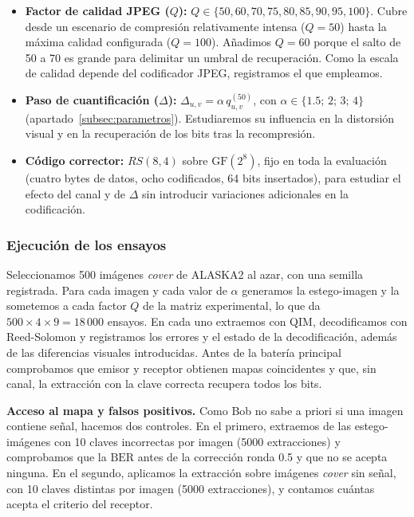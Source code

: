 \documentclass[IB]{TFUOC}%
\begin{document}
\begin{itemize}
    \item \textbf{Factor de calidad JPEG ($Q$):} $Q\in\{50, 60, 70, 75, 80, 85, 90, 95, 100\}$. Cubre desde un escenario de compresión relativamente intensa ($Q=50$) hasta la máxima calidad configurada ($Q=100$). Añadimos $Q=60$ porque el salto de 50 a 70 es grande para delimitar un umbral de recuperación. Como la escala de calidad depende del codificador JPEG, registramos el que empleamos.
    \item \textbf{Paso de cuantificación ($\Delta$):} $\Delta_{u,v}=\alpha\,q^{(50)}_{u,v}$, con $\alpha\in\{1{.}5;\,2;\,3;\,4\}$ (apartado~\ref{subsec:parametros}). Estudiaremos su influencia en la distorsión visual y en la recuperación de los bits tras la recompresión.
    \item \textbf{Código corrector:} $RS(8,4)$ sobre $\mathrm{GF}(2^8)$, fijo en toda la evaluación (cuatro bytes de datos, ocho codificados, 64 bits insertados), para estudiar el efecto del canal y de $\Delta$ sin introducir variaciones adicionales en la codificación.
\end{itemize}

\subsubsection{Ejecución de los ensayos}

Seleccionamos 500 imágenes \textit{cover} de ALASKA2 al azar, con una semilla registrada. Para cada imagen y cada valor de $\alpha$ generamos la estego-imagen y la sometemos a cada factor $Q$ de la matriz experimental, lo que da $500\times4\times9=18\,000$ ensayos. En cada uno extraemos con QIM, decodificamos con Reed-Solomon y registramos los errores y el estado de la decodificación, además de las diferencias visuales introducidas. Antes de la batería principal comprobamos que emisor y receptor obtienen mapas coincidentes y que, sin canal, la extracción con la clave correcta recupera todos los bits.

\textbf{Acceso al mapa y falsos positivos.} Como Bob no sabe a priori si una imagen contiene señal, hacemos dos controles. En el primero, extraemos de las estego-imágenes con 10 claves incorrectas por imagen (5000 extracciones) y comprobamos que la $\mathrm{BER}$ antes de la corrección ronda 0.5 y que no se acepta ninguna. En el segundo, aplicamos la extracción sobre imágenes \textit{cover} sin señal, con 10 claves distintas por imagen (5000 extracciones), y contamos cuántas acepta el criterio del receptor.
\end{document}
